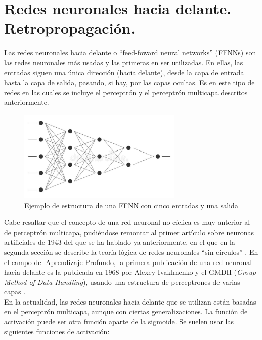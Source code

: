 \documentclass[11pt,twoside,titlepage,a4paper]{article}
\numberwithin{equation}{section} %
\theoremstyle{usual}
\begin{document}
\newpage
\section{Redes neuronales hacia delante. Retropropagación.}

Las redes neuronales hacia delante o ``feed-foward neural networks'' (FFNNs) son
las redes neuronales más usadas y las primeras en ser utilizadas. En ellas, las
entradas siguen una única dirección (hacia delante), desde la capa de entrada
hasta la capa de salida, pasando, si hay, por las capas ocultas. Es en este tipo de
redes en las cuales se incluye el perceptrón y el perceptrón multicapa descritos 
anteriormente.\\

\begin{figure}[!h]
    \centering
    \includegraphics[width=0.7\textwidth]{Source/images/feedfowardnet.jpg}
    \caption{Ejemplo de estructura de una FFNN con cinco entradas y una salida}
    \label{fig:feedfowardnet}
\end{figure}

Cabe resaltar que el concepto de una red neuronal
no cíclica es muy anterior al de perceptrón multicapa, pudiéndose remontar al primer
artículo sobre neuronas artificiales de 1943 del que se ha hablado ya anteriormente,
en el que en la segunda sección se describe la teoría lógica de redes neuronales 
``sin círculos'' \cite{mcculloh-pitts}. En el campo del Aprendizaje Profundo, la 
primera publicación de una red neuronal hacia delante es la publicada en 1968 por 
Alexey Ivakhnenko y el GMDH (\textit{Group Method of Data Handling}), usando una 
estructura de perceptrones de varias capas \cite{jurgen}.\\

En la actualidad, las redes neuronales hacia delante que se utilizan están basadas
en el perceptrón multicapa, aunque con ciertas generalizaciones. La función de
activación puede ser otra función aparte de la sigmoide. Se suelen usar las
siguientes funciones de activación:\\
\end{document}
